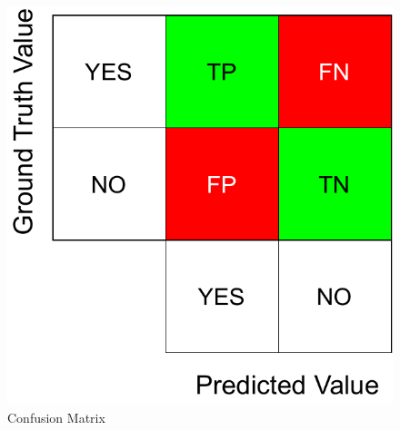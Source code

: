 \begin{figure}[htbp]
    \centering
    \includegraphics[width=0.5\linewidth]{97_graphics//related_work/conf_matrix.pdf}
    \caption{Confusion Matrix}
    \label{fig:related_work-conf_matrix}
\end{figure}

